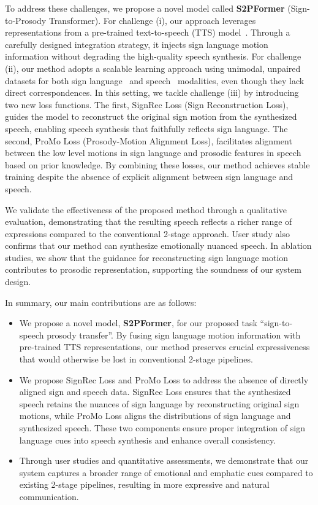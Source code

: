 To address these challenges, we propose a novel model called \textbf{S2PFormer} (Sign-to-Prosody Transformer). For challenge (i), our approach leverages representations from a pre-trained text-to-speech (TTS) model~\cite{ren2021fastspeech}.
Through a carefully designed integration strategy, it injects sign language motion information without degrading the high-quality speech synthesis.
For challenge (ii), our method adopts a scalable learning approach using unimodal, unpaired datasets for both sign language~\cite{shi-etal-2022-open} and speech~\cite{VCTK} modalities, even though they lack direct correspondences. In this setting, we tackle challenge (iii) by introducing two new loss functions. The first, SignRec Loss (Sign Reconstruction Loss), guides the model to reconstruct the original sign motion from the synthesized speech, enabling speech synthesis that faithfully reflects sign language. The second, ProMo Loss (Prosody-Motion Alignment Loss), facilitates alignment between the low level motions in sign language and prosodic features in speech based on prior knowledge. By combining these losses, our method achieves stable training despite the absence of explicit alignment between sign language and speech.

We validate the effectiveness of the proposed method through a qualitative evaluation, demonstrating that the resulting speech reflects a richer range of expressions compared to the conventional 2-stage approach.  User study also confirms that our method can synthesize emotionally nuanced speech. In ablation studies, we show that the guidance for reconstructing sign language motion contributes to prosodic representation, supporting the soundness of our system design.

In summary, our main contributions are as follows:
\begin{itemize}
\item We propose a novel model, \textbf{S2PFormer}, for our proposed task ``sign-to-speech prosody transfer''. By fusing sign language motion information with pre-trained TTS representations, our method preserves crucial expressiveness that would otherwise be lost in conventional 2-stage pipelines.
\item We propose SignRec Loss and ProMo Loss to address the absence of directly aligned sign and speech data. SignRec Loss ensures that the synthesized speech retains the nuances of sign language by reconstructing original sign motions, while ProMo Loss aligns the distributions of sign language and synthesized speech. These two components ensure proper integration of sign language cues into speech synthesis and enhance overall consistency.
\item Through user studies and quantitative assessments, we demonstrate that our system captures a broader range of emotional and emphatic cues compared to existing 2-stage pipelines, resulting in more expressive and natural communication.
\end{itemize}
